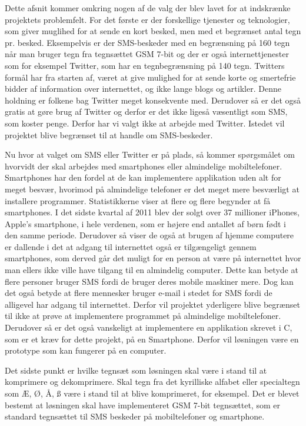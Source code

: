 Dette afsnit kommer omkring nogen af de valg der blev lavet for at indskrænke projektets problemfelt. For det første er der forskellige tjenester og teknologier, som giver muglihed for at sende en kort besked, men med et begrænset antal tegn pr. besked. Eksempelvis er der SMS-beskeder med en begrænsning på 160 tegn når man bruger tegn fra tegnsættet GSM 7-bit\cite{Pro_1} og der er også internettjenester som for eksempel Twitter, som har en tegnbegrænsning på 140 tegn\cite{pro_af1}. Twitters formål har fra starten af, været at give mulighed for at sende korte og smertefrie bidder af information over internettet, og ikke lange blogs og artikler. Denne holdning er folkene bag Twitter meget konsekvente med\cite{pro_af2}. Derudover så er det også gratis at gøre brug af Twitter og derfor er det ikke ligeså væsentligt som SMS, som koster penge. Derfor har vi valgt ikke at arbejde med Twitter. Istedet vil projektet blive begrænset til at handle om SMS-beskeder.

Nu hvor at valget om SMS eller Twitter er på plads, så kommer spørgsmålet om hvorvidt der skal arbejdes med smartphones eller almindelige mobiltelefoner. Smartphones har den fordel at de kan implementere applikation uden alt for meget besvær, hvorimod på almindelige telefoner er det meget mere besværligt at installere programmer. Statistikkerne viser at flere og flere begynder at få smartphones\cite{pro_af3}. I det sidste kvartal af 2011 blev der solgt over 37 millioner iPhones, Apple's smartphone, i hele verdenen, som er højere end antallet af børn født i den samme periode\cite{pro_af4}. Derudover så viser de også at brugen af hjemme computere er dallende i det at adgang til internettet også er tilgængeligt gennem smartphones, som derved går det muligt for en person at være på internettet hvor man ellers ikke ville have tilgang til en almindelig computer\cite{pro_af3}. Dette kan betyde at flere personer bruger SMS fordi de bruger deres mobile maskiner mere. Dog kan det også betyde at flere mennesker bruger e-mail i stedet for SMS fordi de alligevel har adgang til internettet. Derfor vil projektet yderligere blive begrænset til ikke at prøve at implementere programmet på almindelige mobiltelefoner. Derudover så er det også vanskeligt at implementere en applikation skrevet i C, som er et kræv for dette projekt, på en Smartphone. Derfor vil løsningen være en prototype som kan fungerer på en computer.

Det sidste punkt er hvilke tegnsæt som løsningen skal være i stand til at komprimere og dekomprimere. Skal tegn fra det kyrilliske alfabet eller specialtegn som Æ, Ø, Å, ß være i stand til at blive komprimeret, for eksempel. Det er blevet bestemt at løsningen skal have implementeret GSM 7-bit  tegnsættet, som er standard tegnsættet til SMS beskeder på mobiltelefoner og smartphone.
